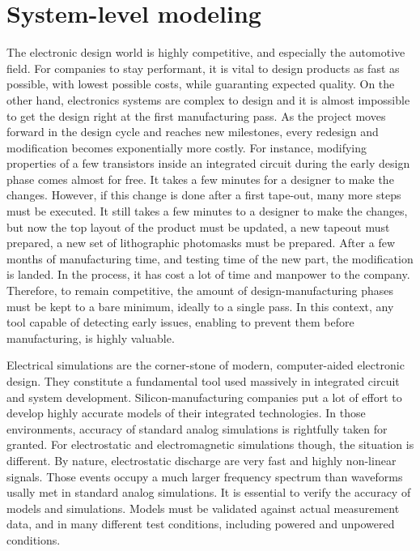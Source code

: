 \section{System-level modeling}
\label{sec:esd-modeling}

The electronic design world is highly competitive, and especially the automotive field.
For companies to stay performant, it is vital to design products as fast as possible, with lowest possible costs, while guaranting expected quality.
On the other hand, electronics systems are complex to design and it is almost impossible to get the design right at the first manufacturing pass.
As the project moves forward in the design cycle and reaches new milestones, every redesign and modification becomes exponentially more costly.
For instance, modifying properties of a few transistors inside an integrated circuit during the early design phase comes almost for free.
It takes a few minutes for a designer to make the changes.
However, if this change is done after a first tape-out, many more steps must be executed.
It still takes a few minutes to a designer to make the changes, but now the top layout of the product must be updated, a new tapeout must prepared, a new set of lithographic photomasks must be prepared.
After a few months of manufacturing time, and testing time of the new part, the modification is landed.
In the process, it has cost a lot of time and manpower to the company.
Therefore, to remain competitive, the amount of design-manufacturing phases must be kept to a bare minimum, ideally to a single pass.
In this context, any tool capable of detecting early issues, enabling to prevent them before manufacturing, is highly valuable.


Electrical simulations are the corner-stone of modern, computer-aided electronic design.
They constitute a fundamental tool used massively in integrated circuit and system development.
Silicon-manufacturing companies put a lot of effort to develop highly accurate models of their integrated technologies.
In those environments, accuracy of standard analog simulations is rightfully taken for granted.
For electrostatic and electromagnetic simulations though, the situation is different.
By nature, electrostatic discharge are very fast and highly non-linear signals.
Those events occupy a much larger frequency spectrum than waveforms usally met in standard analog simulations.
It is essential to verify the accuracy of models and simulations.
Models must be validated against actual measurement data, and in many different test conditions, including powered and unpowered conditions.

